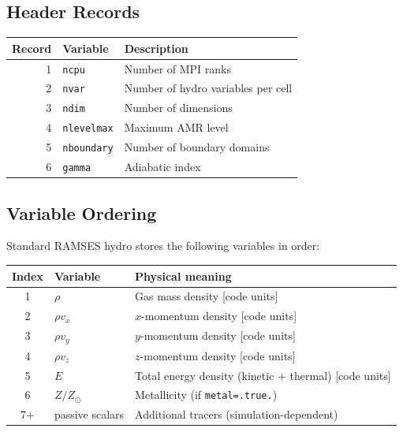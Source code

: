 \documentclass[english,a4paper]{my_memo}
\begin{document}
\subsection{Header Records}

\begin{center}
\begin{tabular}{rll}
\toprule
Record & Variable & Description \\
\midrule
1 & \texttt{ncpu}     & Number of MPI ranks \\
2 & \texttt{nvar}     & Number of hydro variables per cell \\
3 & \texttt{ndim}     & Number of dimensions \\
4 & \texttt{nlevelmax}& Maximum AMR level \\
5 & \texttt{nboundary}& Number of boundary domains \\
6 & \texttt{gamma}    & Adiabatic index \\
\bottomrule
\end{tabular}
\end{center}

\subsection{Variable Ordering}

Standard RAMSES hydro stores the following variables in order:

\begin{center}
\begin{tabular}{cll}
\toprule
Index & Variable & Physical meaning \\
\midrule
1 & $\rho$           & Gas mass density [code units] \\
2 & $\rho v_x$       & $x$-momentum density [code units] \\
3 & $\rho v_y$       & $y$-momentum density [code units] \\
4 & $\rho v_z$       & $z$-momentum density [code units] \\
5 & $E$              & Total energy density (kinetic + thermal) [code units] \\
6 & $Z/Z_\odot$      & Metallicity (if \texttt{metal=.true.}) \\
7$+$ & passive scalars & Additional tracers (simulation-dependent) \\
\bottomrule
\end{tabular}
\end{center}
\end{document}
